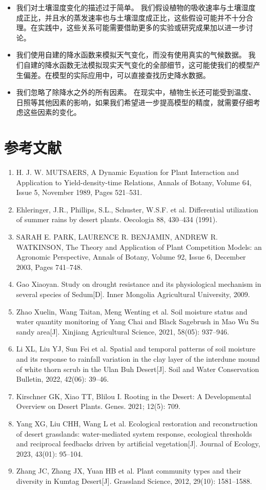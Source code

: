 \documentclass[11pt,a4paper]{ctexart}
\begin{document}
\begin{itemize}
\item 我们对土壤湿度变化的描述过于简单。
我们假设植物的吸收速率与土壤湿度成正比，并且水的蒸发速率也与土壤湿度成正比，这些假设可能并不十分合理。在实践中，这些关系可能需要借助更多的实验或研究成果加以进一步讨论。
\item 我们使用自建的降水函数来模拟天气变化，而没有使用真实的气候数据。
我们自建的降水函数无法模拟现实天气变化的全部细节，这可能使我们的模型产生偏差。在模型的实际应用中，可以直接查找历史降水数据。
\item 我们忽略了除降水之外的所有因素。
在现实中，植物生长还可能受到温度、日照等其他因素的影响，如果我们希望进一步提高模型的精度，就需要仔细考虑这些因素的变化。
\end{itemize}

\section*{参考文献}

\begin{enumerate}
\item[{[1]}] H. J. W. MUTSAERS, A Dynamic Equation for Plant Interaction and Application to Yield-density-time Relations, Annals of Botany, Volume 64, Issue 5, November 1989, Pages 521--531.
\item[{[2]}] Ehleringer, J.R., Phillips, S.L., Schuster, W.S.F. et al. Differential utilization of summer rains by desert plants. Oecologia 88, 430--434 (1991).
\item[{[3]}] SARAH E. PARK, LAURENCE R. BENJAMIN, ANDREW R. WATKINSON, The Theory and Application of Plant Competition Models: an Agronomic Perspective, Annals of Botany, Volume 92, Issue 6, December 2003, Pages 741--748.
\item[{[4]}] Gao Xiaoyan. Study on drought resistance and its physiological mechanism in several species of Sedum[D]. Inner Mongolia Agricultural University, 2009.
\item[{[5]}] Zhao Xuelin, Wang Taitan, Meng Wenting et al. Soil moisture status and water quantity monitoring of Yang Chai and Black Sagebrush in Mao Wu Su sandy area[J]. Xinjiang Agricultural Science, 2021, 58(05): 937--946.
\item[{[6]}] Li XL, Liu YJ, Sun Fei et al. Spatial and temporal patterns of soil moisture and its response to rainfall variation in the clay layer of the interdune mound of white thorn scrub in the Ulan Buh Desert[J]. Soil and Water Conservation Bulletin, 2022, 42(06): 39--46.
\item[{[7]}] Kirschner GK, Xiao TT, Blilou I. Rooting in the Desert: A Developmental Overview on Desert Plants. Genes. 2021; 12(5): 709.
\item[{[8]}] Yang XG, Liu CHH, Wang L et al. Ecological restoration and reconstruction of desert grasslands: water-mediated system response, ecological thresholds and reciprocal feedbacks driven by artificial vegetation[J]. Journal of Ecology, 2023, 43(01): 95--104.
\item[{[9]}] Zhang JC, Zhang JX, Yuan HB et al. Plant community types and their diversity in Kumtag Desert[J]. Grassland Science, 2012, 29(10): 1581--1588.
\end{enumerate}
\end{document}
